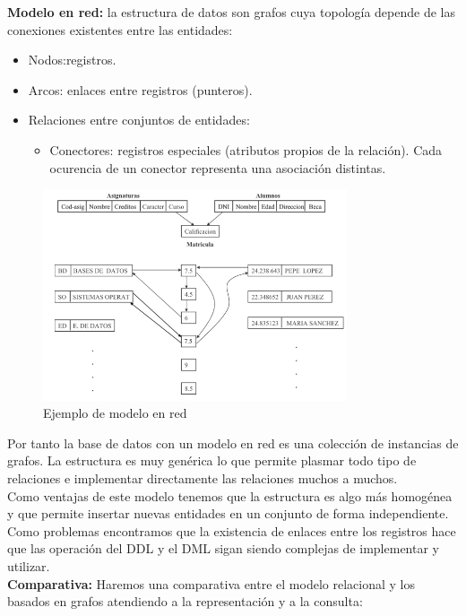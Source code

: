 \documentclass[a4paper,11pt]{article}
\begin{document}
\textbf{Modelo en red:} la estructura de datos son grafos cuya topología depende de las conexiones existentes entre las entidades:

\begin{itemize}
\item Nodos:registros.
\item Arcos: enlaces entre registros (punteros).
\item Relaciones entre conjuntos de entidades:
	
	\begin{itemize}
		\item Conectores: registros especiales (atributos propios de la relación). Cada ocurencia de un conector representa una asociación distintas.
	\end{itemize}
\end{itemize}

\begin{figure}[h]
\centering
\includegraphics[scale=1,width=0.8\textwidth]{modelo_red.png}
\caption{Ejemplo de modelo en red}
\end{figure}


Por tanto la base de datos con un modelo en red es una colección de instancias de grafos. La estructura es muy genérica lo que permite plasmar todo tipo de relaciones e implementar directamente las relaciones muchos a muchos. \\

Como ventajas de este modelo tenemos que la estructura es algo más homogénea y que permite insertar nuevas entidades en un conjunto de forma independiente. Como problemas encontramos que la existencia de enlaces entre los registros hace que las operación del DDL y el DML sigan siendo complejas de implementar y utilizar. \\

\textbf{Comparativa:}
Haremos una comparativa entre el modelo relacional y los basados en grafos atendiendo a la representación y a la consulta:
\end{document}
